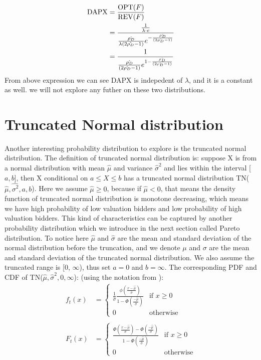 \begin{equation}\notag
\begin{split}	
	\text{DAPX} &= \frac{\text{OPT}(F)}{\text{REV}(F)} \\&= \frac{\frac{1}{\lambda \cdot e}}{\frac{\hat{\rho_D}}{\lambda (2\hat{\rho_D} - 1)}e^{- \frac{\hat{\rho_D}}{(2\hat{\rho_D} - 1)}}} \\&= \frac{1}{\frac{\hat{\rho_D}}{(2\hat{\rho_D} - 1)}e^{1- \frac{\hat{\rho_D}}{(2\hat{\rho_D} - 1)}}}
\end{split}
\end{equation} 
From above expression we can see DAPX is indepedent of $\lambda$, and it is a constant as well. 
we will not explore any futher on these two distributions.


\section{Truncated Normal distribution} \label{Normal distribution} 
Another interesting probability distribution to explore is the truncated normal distribution. The definition of truncated normal distribution is: suppose X is from a normal distribution with mean $\hat{\mu}$ and variance $\hat{\sigma}^2$ and lies within the interval [$a,b$], then X conditional on $a \leqslant X  \leqslant b$ has a truncated normal distribution TN($\hat{\mu}, \hat{\sigma^2}, a,b$). Here we assume $\hat{\mu} \geqslant0 $, because if $\hat{\mu} <0$, that means the density function of truncated normal distribution is monotone decreasing, which means we have high probability of low valuation bidders and low probability of high valuation bidders. This kind of characteristics can be captured by another probability distribution which we introduce in the next section called Pareto distribution. To notice here $\hat{\mu}$ and $\hat{\sigma}$ are the mean and standard deviation of the normal distribution before the truncation, and we denote $\mu$ and $\sigma$ are the mean and standard deviation of the truncated normal distribution. We also assume the truncated range is [0, $\infty$), thus set $a = 0$ and $b = \infty$. The corresponding PDF and CDF of TN($\hat{\mu}, \hat{\sigma}^2, 0,\infty$): (using the notation from \cite{kotz1994continuous}):
\begin{align*}
	f_t(x) &=\begin{cases}
			\frac{1}{\hat{\sigma}} \frac{\phi(\frac{x- \hat{\mu}}{\hat{\sigma}})}{1 - \Phi(\frac{- \hat{\mu}}{\hat{\sigma}})}  & \text{if }  x \geqslant 0 \\ 0 & \text{otherwise}
			\end{cases}\\ \\
	F_t(x) &= \begin{cases}	
			\frac{\Phi(\frac{x- \hat{\mu}}{\hat{\sigma}}) - \Phi(\frac{- \hat{\mu}}{\hat{\sigma}})}{1 - \Phi(\frac{- \hat{\mu}}{\hat{\sigma}})}  & \text{if } x \geqslant 0 \\ 0 & \text{otherwise}
			\end{cases} 
\end{align*}
